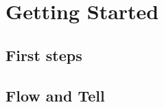 \usepackage{lipsum}
\usepackage{tcolorbox}


\usepackage[english]{babel}
\usepackage[T1]{fontenc}
\usepackage{lmodern,mathrsfs}
\usepackage{xparse}
\usepackage[most]{tcolorbox}
\usepackage{minted} %



\newcommand{\keyword}[1]{\textcolor{blue}{#1}}







\coverpage{\TITLE}{\SUBTITLE}{\AUTHOR}{\DATE}{\SUBJECT}
\newpage
\tableofcontents

\part{Getting Started}
\newpage
\chapter{First steps} \label{ch:first}



\newpage
\chapter{Flow and Tell}\label{ch:flow}




